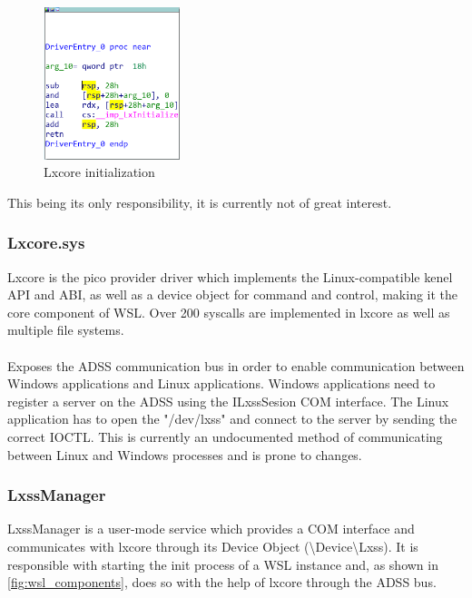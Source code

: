             \begin{figure}[H]
                \centering
                \includegraphics[width=150px, keepaspectratio]{img/lxss.png}
                \caption{Lxcore initialization}
                \label{fig:lxss}
            \end{figure}

            This being its only responsibility, it is currently not of great interest.
            
            \subsubsection{Lxcore.sys}
            Lxcore is the pico provider driver which implements the Linux-compatible kenel API and ABI, as well as a device object for command
            and control\cite{Bluehat2016AI}, making it the core component of WSL. Over 200 syscalls are implemented in lxcore as well as
            multiple file systems.

            \paragraph{}
            Exposes the ADSS communication bus in order to enable communication between Windows applications and Linux applications. Windows
            applications need to register a server on the ADSS using the ILxssSesion COM interface. The Linux application has to open the
            "/dev/lxss" and connect to the server by sending the correct IOCTL. This is currently an undocumented method of communicating
            between Linux and Windows processes and is prone to changes.

            \subsubsection{LxssManager}
            LxssManager is a user-mode service which provides a COM interface and communicates with lxcore through its Device Object
            (\textbackslash Device\textbackslash Lxss). It is responsible with starting the init process of a WSL instance and, as shown
            in \ref{fig:wsl_components}, does so with the help of lxcore through the ADSS bus.

